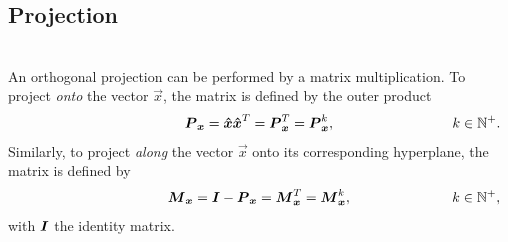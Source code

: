\subsection*{Projection}
\cite{projection_matrix}\\
An orthogonal projection can be performed by a matrix multiplication. To project \emph{onto} the vector $\vec{x}$, the matrix is defined by the outer product
\begin{align*}
\lcr{}{
\projmat{x} = \uvec{x} \uvec{x}^T = \projmat{x}^T =
\projmat{x}^k,
}{
k \in \mathbb{N}^+.
}
\end{align*}
Similarly, to project \emph{along} the vector $\vec{x}$ onto its corresponding hyperplane, the matrix is defined by
\begin{align*}
\lcr{}{
\resprojmat{x} = \mat{I} - \projmat{x} = \resprojmat{x}^T = \resprojmat{x}^k,
}{
k \in \mathbb{N}^+,
}
\end{align*}
with $\boldsymbol{I}$ the identity matrix.
